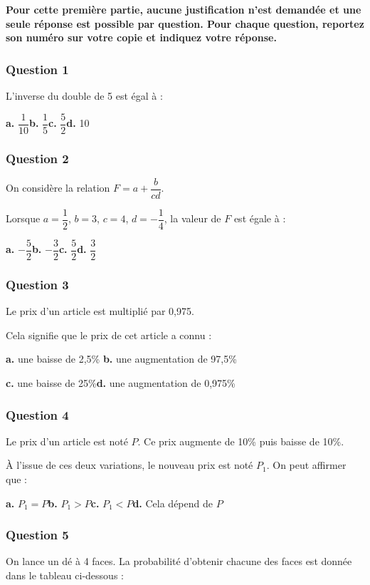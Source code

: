 \textbf{Pour cette première partie, aucune justification n'est demandée et une seule réponse est possible par question. Pour chaque question, reportez son numéro sur votre copie et indiquez votre réponse.}

\subsubsection*{Question 1}
L'inverse du double de 5 est égal à :

\textbf{a.} $\dfrac{1}{10}$\hfill \textbf{b.} $\dfrac{1}{5}$\hfill \textbf{c.} $\dfrac{5}{2}$\hfill \textbf{d.} 10

\subsubsection*{Question 2}
On considère la relation $F = a + \dfrac{b}{cd}$.

Lorsque $a = \dfrac{1}{2}$, $b = 3$, $c = 4$, $d = -\dfrac{1}{4}$, la valeur de $F$ est égale à :

\textbf{a.} $-\dfrac{5}{2}$\hfill \textbf{b.} $-\dfrac{3}{2}$\hfill \textbf{c.} $\dfrac{5}{2}$\hfill \textbf{d.} $\dfrac{3}{2}$

\subsubsection*{Question 3}
Le prix d'un article est multiplié par 0,975.

Cela signifie que le prix de cet article a connu :

\textbf{a.}  une baisse de 2,5\% \hfill \textbf{b.} une augmentation de 97,5\%

\textbf{c.} une baisse de 25\%\hfill \textbf{d.} une augmentation de 0,975\%

\subsubsection*{Question 4}
Le prix d'un article est noté $P$. Ce prix augmente de 10\% puis baisse de 10\%.

À l'issue de ces deux variations, le nouveau prix est noté $P_1$. On peut affirmer que :

\textbf{a.} $P_1 = P$\hfill \textbf{b.} $P_1 > P$\hfill \textbf{c.} $P_1 < P$\hfill \textbf{d.} Cela dépend de $P$

\subsubsection*{Question 5}
On lance un dé à 4 faces. La probabilité d'obtenir chacune des faces est donnée dans le tableau ci-dessous :

